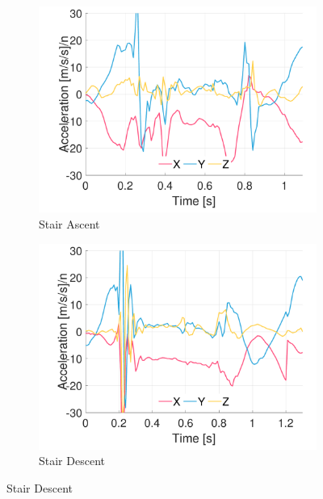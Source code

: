 \begin{figure}[p]
    \begin{subfigure}[b]{0.49\textwidth}
         \centering
         \includegraphics[width=\textwidth]{content/3-Methods/example-data/ch3_example_data_subject_01_r_ankle_accel_activity_stair_down.pdf}
         \caption{Stair Ascent}
    \end{subfigure}
    \begin{subfigure}[b]{0.49\textwidth}
         \centering
         \includegraphics[width=\textwidth]{content/3-Methods/example-data/ch3_example_data_subject_01_r_ankle_accel_activity_stair_up.pdf}
         \caption{Stair Descent}
    \end{subfigure}
    

\end{figure}
